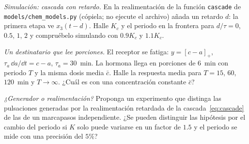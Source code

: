\begin{exercise}[\lvlB]
\label{ex:16:5}
\emph{Simulación: cascada con retardo.} En la realimentación de la función \texttt{cascade} de \texttt{models/\allowbreak chem\_models.py} (cópiela; no ejecute el archivo) añada un retardo $d$: la primera etapa ve $x_3(t-d)$. Halle $K_c$ y el periodo en la frontera para $d/\tau=0$, $0.5$, $1$, $2$ y compruébelo simulando con $0.9K_c$ y $1.1K_c$.
\end{exercise}

\begin{exercise}[\lvlB]
\label{ex:16:6}
\emph{Un destinatario que lee porciones.} El receptor se fatiga: $y=[c-a]_+$, $\tau_a\,\dd a/\dd t=c-a$, $\tau_a=30$~min. La hormona llega en porciones de $6$~min con periodo $T$ y la misma dosis media $\bar c$. Halle la respuesta media para $T=15$, $60$, $120$~min y $T\to\infty$. ¿Cuál es con una concentración constante $\bar c$?
\end{exercise}

\begin{exercise}[\lvlC]
\label{ex:16:7}
\emph{¿Generador o realimentación?} Proponga un experimento que distinga las pulsaciones generadas por la realimentación retardada de la cascada~\eqref{eq:cascade} de las de un marcapasos independiente. ¿Se pueden distinguir las hipótesis por el cambio del periodo si $K$ solo puede variarse en un factor de $1.5$ y el periodo se mide con una precisión del $5\%$?
\end{exercise}
